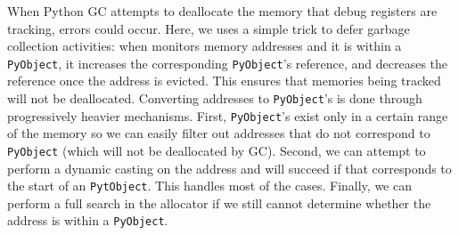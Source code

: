 When Python GC attempts to deallocate the memory that debug registers are tracking, errors could occur. Here, we uses a simple trick to defer garbage collection activities: when \tool monitors memory addresses and it  is within a {\tt PyObject}, it increases the corresponding {\tt PyObject}'s reference, and decreases the reference once the address is evicted. This ensures that memories being tracked will not be deallocated. Converting addresses to {\tt PyObject}'s is done through progressively heavier mechanisms. First, {\tt PyObject}'s exist only in a certain range of the memory so we can easily filter out addresses that do not correspond to {\tt PyObject} (which will not be deallocated by GC). Second, we can attempt to perform a dynamic casting on the address and will succeed if that corresponds to the start of an {\tt PytObject}. This handles most of the cases. Finally, we can perform a full search in the allocator if we still cannot determine whether the address is within a {\tt PyObject}. 










